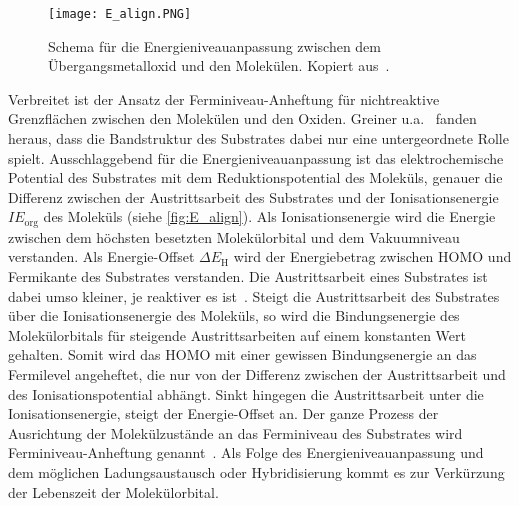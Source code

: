             \begin{figure}
                \centering
                \texttt{[image: E\_align.PNG]}
                \caption{Schema für die Energieniveauanpassung zwischen dem Übergangsmetalloxid und den Molekülen. Kopiert aus~\cite{IF_3}.}
                \label{fig:E_align}
            \end{figure}
            Verbreitet ist der Ansatz der Ferminiveau-Anheftung für nichtreaktive Grenzflächen zwischen den Molekülen und den Oxiden.
            Greiner u.a.~\cite{IF_3} fanden heraus, dass die Bandstruktur des Substrates dabei nur eine untergeordnete Rolle spielt.
            Ausschlaggebend für die Energieniveauanpassung ist das elektrochemische Potential des Substrates mit dem Reduktionspotential des Moleküls, genauer die Differenz zwischen der Austrittsarbeit des Substrates und der Ionisationsenergie $IE_\text{org}$ des Moleküls (siehe \autoref{fig:E_align}).
            Als Ionisationsenergie wird die Energie zwischen dem höchsten besetzten Molekülorbital und dem Vakuumniveau verstanden.
            Als Energie-Offset $\Delta E_\text{H}$ wird der Energiebetrag zwischen HOMO und Fermikante des Substrates verstanden.
            Die Austrittsarbeit eines Substrates ist dabei umso kleiner, je reaktiver es ist~\cite{5A_5}.
            Steigt die Austrittsarbeit des Substrates über die Ionisationsenergie des Moleküls, so wird die Bindungsenergie des Molekülorbitals für steigende Austrittsarbeiten auf einem konstanten Wert gehalten.
            Somit wird das HOMO mit einer gewissen Bindungsenergie an das Fermilevel angeheftet, die nur von der Differenz zwischen der Austrittsarbeit und des Ionisationspotential abhängt.
            Sinkt hingegen die Austrittsarbeit unter die Ionisationsenergie, steigt der Energie-Offset an.
            Der ganze Prozess der Ausrichtung der Molekülzustände an das Ferminiveau des Substrates wird Ferminiveau-Anheftung genannt~\cite{IF_3}.
            Als Folge des Energieniveauanpassung und dem möglichen Ladungsaustausch oder Hybridisierung kommt es zur Verkürzung der Lebenszeit der Molekülorbital.


